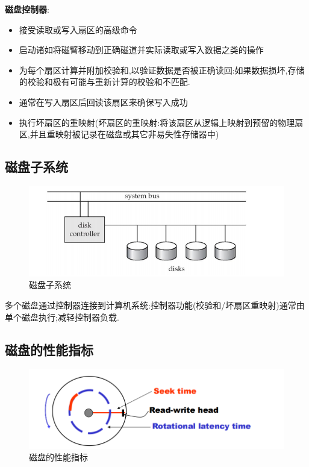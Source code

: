 \noindent\textbf{磁盘控制器}:

\begin{itemize}
    \item 接受读取或写入扇区的高级命令
    \item 启动诸如将磁臂移动到正确磁道并实际读取或写入数据之类的操作
    \item 为每个扇区计算并附加校验和,以验证数据是否被正确读回:如果数据损坏,存储的校验和极有可能与重新计算的校验和不匹配.
    \item 通常在写入扇区后回读该扇区来确保写入成功
    \item 执行坏扇区的重映射(坏扇区的重映射:将该扇区从逻辑上映射到预留的物理扇区,并且重映射被记录在磁盘或其它非易失性存储器中)
\end{itemize}

\subsection{磁盘子系统}

\begin{figure}[H]
    \centering
    \includegraphics[width=0.8\linewidth]{image4.png}
    \caption{磁盘子系统}
    \label{}
\end{figure}

多个磁盘通过控制器连接到计算机系统:控制器功能(校验和/坏扇区重映射)通常由单个磁盘执行;减轻控制器负载.

\subsection{磁盘的性能指标}

\begin{figure}[H]
    \centering
    \includegraphics[width=0.8\linewidth]{image5.png}
    \caption{磁盘的性能指标}
    \label{}
\end{figure}

